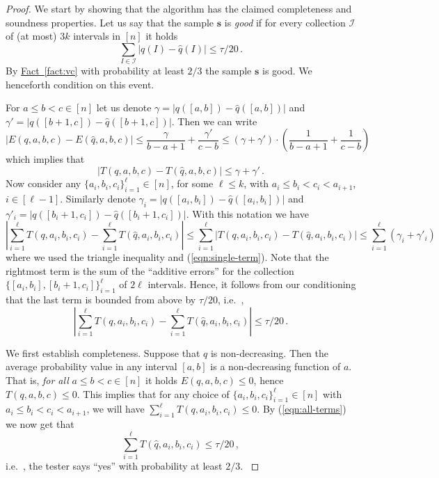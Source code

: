 \documentclass[10pt]{article}
\theoremstyle{definition}
\providecommand{\ie}{i.e.\ }
\numberwithin{equation}{section}
\newcommand{\expref}[2]{\texorpdfstring{\hyperref[#2]{#1~\ref{#2}}}{#1~\ref{#2}}}
\newcommand{\wh}[1]{{\widehat{#1}}}
\begin{document}
\begin{proof}
We start by showing that the algorithm has the claimed completeness and soundness
properties.
Let us say that the sample $\mathbf{s}$ is \emph{good} if 
for every collection $\mathcal{I}$ of (at most) $3k$ intervals in $[n]$ it holds 
$$\sum_{I \in \mathcal{I}} |q(I) - \wh{q}(I) | \le \tau/20\,.$$ By \expref{Fact}{fact:vc}
with probability at least $2/3$ the sample $\mathbf{s}$ is good.
We henceforth condition on this event.
  

For $a \leq b  < c \in [n]$ let us denote $\gamma = \left| q([a,b]) - \wh{q}([a,b])\right|$ and $\gamma' = \left| q([b+1,c]) - \wh{q}([b+1,c])\right|$. 
Then we can write
$$
|E(q, a,b,c) - E(\wh{q}, a,b,c)| \le \frac{\gamma}{b-a+1} +  \frac{\gamma'}{c-b} \le (\gamma+\gamma') \cdot \left( \frac{1}{b-a+1} +  \frac{1}{c-b} \right)
$$
which implies that
\begin{equation} \label{eqn:single-term}
|T(q, a,b,c) - T(\wh{q}, a,b,c)| \le \gamma + \gamma'\,.
\end{equation}
Now consider any $\{a_i, b_i, c_i\}_{i=1}^{\ell} \in  [n]$, for some $\ell \le k$, with $a_i \le b_i < c_i < a_{i+1}$, $i \in [\ell-1]$. 
Similarly denote $\gamma_i = \left| q([a_i,b_i]) - \wh{q}([a_i,b_i])\right|$ and $\gamma'_i = \left| q([b_i+1,c_i]) - \wh{q}([b_i+1,c_i])\right|$. 
With this notation we have
\[ 
\left|  \sum_{i=1}^{\ell} T(q, a_i, b_i, c_i)  -  \sum_{i=1}^{\ell} T(\wh{q}, a_i, b_i, c_i) \right| 
\le  \sum_{i=1}^{\ell} |T(q, a_i,b_i,c_i) - T(\wh{q}, a_i,b_i,c_i)| \le \sum_{i=1}^{\ell} (\gamma_i +\gamma'_i)
\]
where we used the triangle inequality and (\ref{eqn:single-term}). 
Note that the rightmost term is the sum of the ``additive errors'' for the collection $\{ [a_i, b_i], [b_i+1, c_i] \}_{i=1}^{\ell}$ of $2\ell$ intervals.
Hence, it follows from our conditioning that the last term is bounded from above by $\tau/20$, \ie, 
\begin{equation} \label{eqn:all-terms}
\left|  \sum_{i=1}^{\ell} T(q, a_i, b_i, c_i)  -  \sum_{i=1}^{\ell} T(\wh{q}, a_i, b_i, c_i) \right| 
\le \tau/20\,.
\end{equation}

We first establish completeness. Suppose that $q$ is non-decreasing. Then the average probability
value in any interval $[a,b]$ is a non-decreasing function of $a$.
That is, \emph{for all} $a \leq b < c \in [n]$ it holds
$E(q, a,b,c) \leq 0$, {hence $T(q,a,b,c) \leq 0$. This implies that for any choice of $\{a_i, b_i, c_i\}_{i=1}^{\ell} \in  [n]$ with $a_i \le b_i < c_i < a_{i+1}$, we will have 
$\sum_{i=1}^{\ell} T(q, a_i, b_i, c_i) \le 0$. By (\ref{eqn:all-terms}) we now get that $$\sum_{i=1}^{\ell} T(\wh{q}, a_i, b_i, c_i) \le \tau/20\,,$$ \ie, the tester 
says ``yes'' with probability at least $2/3$.
} 


\end{proof}
\end{document}
